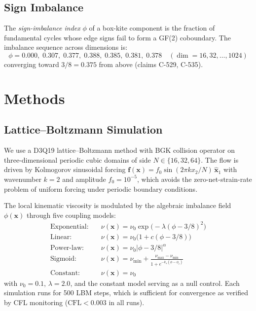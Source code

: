 \documentclass[12pt]{article}
\theoremstyle{definition}
\theoremstyle{plain}
\theoremstyle{remark}
\begin{document}
\subsection{Sign Imbalance}

The \emph{sign-imbalance index} $\phi$ of a box-kite component is the fraction
of fundamental cycles whose edge signs fail to form a GF(2) coboundary.
The imbalance sequence across dimensions is:
\begin{equation}
  \phi = 0.000,\; 0.307,\; 0.377,\; 0.388,\; 0.385,\; 0.381,\; 0.378
  \quad (\dim = 16, 32, \ldots, 1024)
  \label{eq:imbalance-index}
\end{equation}
converging toward $3/8 = 0.375$ from above (claims C-529, C-535).

\section{Methods}
\label{sec:methods}

\subsection{Lattice--Boltzmann Simulation}
\label{sec:lbm}

We use a D3Q19 lattice--Boltzmann method with BGK collision operator on
three-dimensional periodic cubic domains of side $N \in \{16, 32, 64\}$.
The flow is driven by Kolmogorov sinusoidal forcing
$\mathbf{f}(\mathbf{x}) = f_0 \sin(2\pi k x_2 / N) \, \hat{\mathbf{x}}_1$
with wavenumber $k = 2$ and amplitude $f_0 = 10^{-5}$, which avoids the
zero-net-strain-rate problem of uniform forcing under periodic boundary
conditions.

The local kinematic viscosity is modulated by the algebraic imbalance
field $\phi(\mathbf{x})$ through five coupling models:
\begin{align}
  \text{Exponential:} \quad & \nu(\mathbf{x}) = \nu_0 \exp\bigl(-\lambda
    (\phi - 3/8)^2\bigr) \label{eq:coupling-exp} \\
  \text{Linear:} \quad & \nu(\mathbf{x}) = \nu_0 \bigl(1 + c(\phi - 3/8)\bigr) \\
  \text{Power-law:} \quad & \nu(\mathbf{x}) = \nu_0 |\phi - 3/8|^{\alpha} \\
  \text{Sigmoid:} \quad & \nu(\mathbf{x}) = \nu_{\min} +
    \frac{\nu_{\max} - \nu_{\min}}{1 + e^{-k_s(\phi - \phi_c)}} \\
  \text{Constant:} \quad & \nu(\mathbf{x}) = \nu_0
\end{align}
with $\nu_0 = 0.1$, $\lambda = 2.0$, and the constant model serving as a
null control.  Each simulation runs for 500 LBM steps, which is sufficient
for convergence as verified by CFL monitoring ($\mathrm{CFL} < 0.003$ in
all runs).
\end{document}
